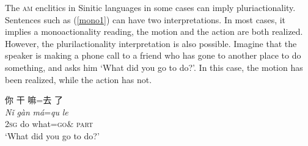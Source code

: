 \documentclass[oneside,a4paper,11pt]{article}
\newcommand{\ipa}[1]{{\phon\textit{#1}}}
\newcommand{\zh}[1]{{\cn #1}}
\newcommand{\sens}[1]{‘#1’}
\begin{document}
The \textsc{am} enclitics in Sinitic languages in some cases can imply pluriactionality.  Sentences such as (\ref{mono1}) can have two interpretations. In most cases, it implies a monoactionality reading, the motion and the action are both realized. However, the plurilactionality interpretation is also possible. Imagine that the speaker is making a phone call to a friend who has gone to another place to do something, and asks him \sens{What did you go to do?}. In this case, the motion has been realized, while the action has not. 

\begin{exe}
\ex \label{mono1}
\glll
\zh{你} \zh{干} \zh{嘛}=\zh{去} \zh{了} \\
\ipa{Nǐ} \ipa{gàn} \ipa{má}=\ipa{qu} \ipa{le} \\
\textsc{2sg} do what=\textsc{go}$\&$ \textsc{part} \\
\glt \sens{What did you go to do?}
\end{exe}

 
\end{document}
